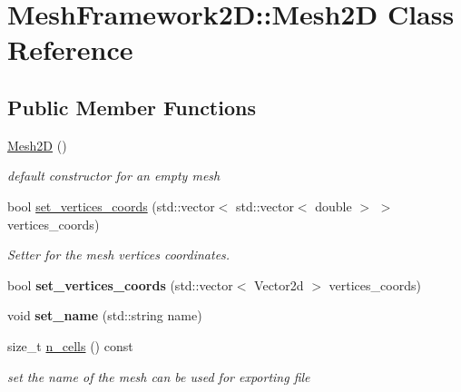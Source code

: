 \hypertarget{classMeshFramework2D_1_1Mesh2D}{}\section{Mesh\+Framework2D\+:\+:Mesh2D Class Reference}
\label{classMeshFramework2D_1_1Mesh2D}
\subsection*{Public Member Functions}
\begin{DoxyCompactItemize}
\item 
\mbox{\label{classMeshFramework2D_1_1Mesh2D_a04b6cd67a13e59ec44be0b19739610e7}} 
\hyperlink{classMeshFramework2D_1_1Mesh2D_a04b6cd67a13e59ec44be0b19739610e7}{Mesh2D} ()
\begin{DoxyCompactList}\small\item\em default constructor for an empty mesh \end{DoxyCompactList}\item 
bool \hyperlink{classMeshFramework2D_1_1Mesh2D_a6d15c8b71c4ef2bb7f2cc9f4af6ee9a6}{set\+\_\+vertices\+\_\+coords} (std\+::vector$<$ std\+::vector$<$ double $>$ $>$ vertices\+\_\+coords)
\begin{DoxyCompactList}\small\item\em Setter for the mesh vertices coordinates. \end{DoxyCompactList}\item 
\mbox{\label{classMeshFramework2D_1_1Mesh2D_ac6af93f0106ba443da176d6f7a6ab16d}} 
bool {\bfseries set\+\_\+vertices\+\_\+coords} (std\+::vector$<$ Vector2d $>$ vertices\+\_\+coords)
\item 
\mbox{\label{classMeshFramework2D_1_1Mesh2D_adc651b14da60cef3ba7c17acf31c13b4}} 
void {\bfseries set\+\_\+name} (std\+::string name)
\item 
size\+\_\+t \hyperlink{classMeshFramework2D_1_1Mesh2D_a684170e0d3616e4c5c3dfc97ed29097b}{n\+\_\+cells} () const
\begin{DoxyCompactList}\small\item\em set the name of the mesh can be used for exporting file \end{DoxyCompactList}\item 

\end{DoxyCompactItemize}
